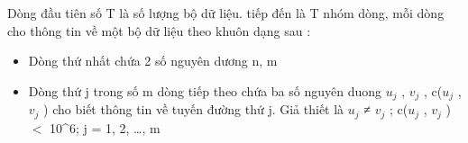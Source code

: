 Dòng đầu tiên số T là số lượng bộ dữ liệu. tiếp đến là T nhóm dòng, mỗi dòng cho thông tin về một bộ dữ liệu theo khuôn dạng sau :
\begin{itemize}
	\item Dòng thứ nhất chứa 2 số nguyên dương n, m
	\item Dòng thứ j trong số m dòng tiếp theo chứa ba số nguyên duong $u_{j}$ , $v_{j}$ , c($u_{j}$ , $v_{j}$ ) cho biết thông tin về tuyến đường thứ j. Giả thiết là $u_{j}$ ≠ $v_{j}$ ; c($u_{j}$ , $v_{j}$ ) $<$ 10^6; j = 1, 2, …, m
\end{itemize}